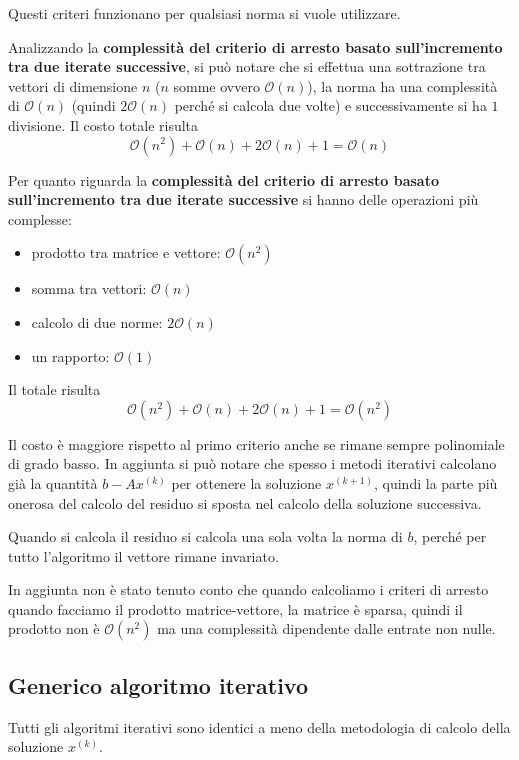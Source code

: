 \begin{nota}
    Questi criteri funzionano per qualsiasi norma si vuole utilizzare.
\end{nota}

Analizzando la \textbf{complessità del criterio di arresto basato sull'incremento tra due 
iterate successive}, si può notare che si effettua una sottrazione tra vettori 
di dimensione $n$ ($n$ somme ovvero $\mathcal{O}(n)$), la norma ha una complessità
di $\mathcal{O}(n)$ (quindi $2\mathcal{O}(n)$ perché si calcola due volte) e 
successivamente si ha $1$ divisione.
Il costo totale risulta
$$\mathcal{O}(n^2)+ \mathcal{O}(n)+2\mathcal{O}(n)+1 = \mathcal{O}(n)$$

Per quanto riguarda la \textbf{complessità del criterio di arresto basato sull'incremento tra due 
iterate successive} si hanno delle operazioni più complesse:
\begin{itemize}
    \item prodotto tra matrice e vettore: $\mathcal{O}(n^2)$
    \item somma tra vettori: $\mathcal{O}(n)$
    \item calcolo di due norme: $2\mathcal{O}(n)$
    \item un rapporto: $\mathcal{O}(1)$
\end{itemize}
Il totale risulta 
$$\mathcal{O}(n^2)+ \mathcal{O}(n)+2\mathcal{O}(n)+1 = \mathcal{O}(n^2)$$

Il costo è maggiore rispetto al primo criterio anche se rimane sempre polinomiale 
di grado basso. In aggiunta si può notare che spesso i metodi iterativi calcolano
già la quantità $b-Ax^{(k)}$ per ottenere la soluzione $x^{(k+1)}$, quindi la parte 
più onerosa del calcolo del residuo si sposta nel calcolo della soluzione successiva.

\begin{nota}
    Quando si calcola il residuo si calcola una sola volta la norma di $b$, perché
    per tutto l'algoritmo il vettore rimane invariato.
\end{nota}

\begin{nota}
    In aggiunta non è stato tenuto conto che quando calcoliamo i criteri di arresto
    quando facciamo il prodotto matrice-vettore, la matrice è sparsa, quindi 
    il prodotto non è $\mathcal{O}(n^2)$ ma una complessità dipendente dalle entrate 
    non nulle.
\end{nota}

\subsection{Generico algoritmo iterativo}
Tutti gli algoritmi iterativi sono identici a meno della metodologia di calcolo
della soluzione $x^{(k)}$.

